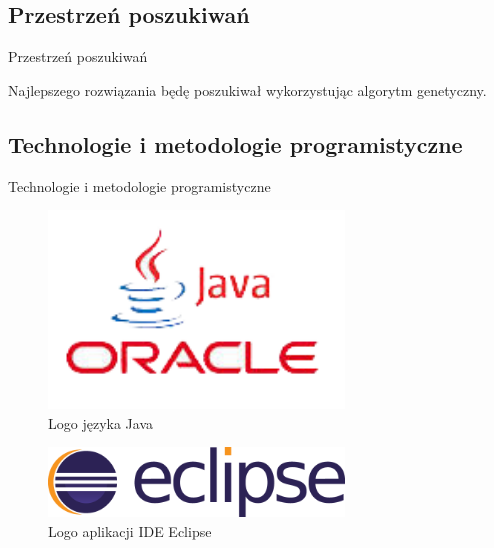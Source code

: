 \documentclass{beamer}
\begin{document}
\subsection{Przestrzeń poszukiwań}
\begin{frame}{Przestrzeń poszukiwań} 

Najlepszego rozwiązania będę poszukiwał wykorzystując algorytm genetyczny.

\end{frame}


\subsection{Technologie i metodologie programistyczne}
\begin{frame}{Technologie i metodologie programistyczne} 

\centering
\begin{minipage}[b]{.48\textwidth}

\begin{figure}
\includegraphics[width=0.7\textwidth]{img/java}
\caption{Logo języka Java\cite{java}}
\end{figure}
\begin{figure}
\includegraphics[width=0.7\textwidth]{img/eclipse}
\caption{Logo aplikacji IDE Eclipse\cite{eclipse}}
\end{figure}

\end{minipage}\hfill
\begin{minipage}[b]{.48\textwidth}


\end{minipage}
\end{frame}
\end{document}
